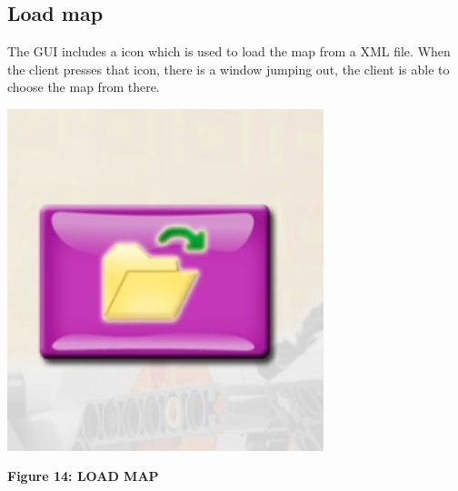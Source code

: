 \documentclass[11pt, a4paper]{report}
\begin{document}
\subsection{Load map}
The GUI includes a icon which is used to load the map from a XML file. When the client presses that icon, there is a window jumping out, the client is able to choose the map from there. 
\begin{center}
 \includegraphics[width=9.20cm]{load}
\end{center}
\begin{center}
\textbf {Figure 14: LOAD MAP} \\[0.3cm]
\end{center}
\end{document}

